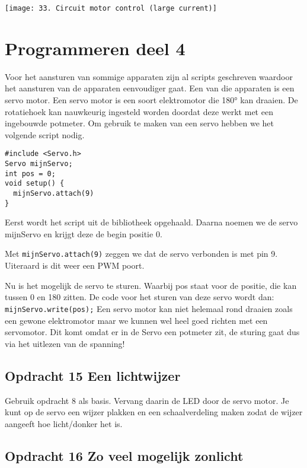 \documentclass{arduino}
\begin{document}
\begin{center}
\texttt{[image: 33. Circuit motor control (large current)]}
\end{center}

\newpage

\section{Programmeren deel 4}


Voor het aansturen van sommige apparaten zijn al scripts geschreven waardoor het aansturen van de apparaten eenvoudiger gaat. Een van die apparaten is een servo motor. Een servo motor is een soort elektromotor die \ang{180} kan draaien. De rotatiehoek kan nauwkeurig ingesteld worden doordat deze werkt met een ingebouwde potmeter. Om gebruik te maken van een servo hebben we het volgende script nodig.

\begin{lstlisting}
#include <Servo.h>
Servo mijnServo;
int pos = 0;
void setup() {
  mijnServo.attach(9)
}
\end{lstlisting}

Eerst wordt het script uit de bibliotheek opgehaald. Daarna noemen we de servo mijnServo en krijgt deze de begin positie 0.

Met \lstinline{mijnServo.attach(9)} zeggen we dat de servo verbonden is met pin 9. Uiteraard is dit weer een PWM poort.

Nu is het mogelijk de servo te sturen. Waarbij pos staat voor de positie, die kan tussen 0 en 180 zitten. De code voor het sturen van deze servo wordt dan: \lstinline{mijnServo.write(pos);} Een servo motor kan niet helemaal rond draaien zoals een gewone elektromotor maar we kunnen wel heel goed richten met een servomotor. Dit komt omdat er in de Servo een potmeter zit, de sturing gaat dus via het uitlezen van de spanning!

\subsection{Opdracht 15 Een lichtwijzer}

Gebruik opdracht 8 als basis. Vervang daarin de LED door de servo motor. Je kunt op de servo een wijzer plakken en een schaalverdeling maken zodat de wijzer aangeeft hoe licht/donker het is.

\subsection{Opdracht 16 Zo veel mogelijk zonlicht}
\end{document}
